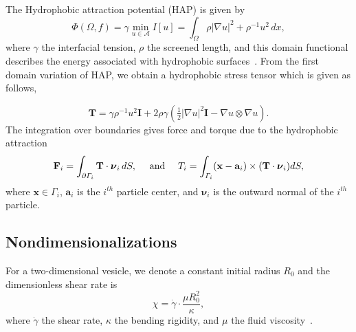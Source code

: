 \documentclass[lineno]{jfm}
\renewcommand{\aa}{\mathbf{a}}
\newcommand{\bd}{\partial}
\newcommand{\FF}{\mathbf{F}}
\newcommand{\nnu}{\boldsymbol{\nu}}
\newcommand{\xx}{\mathbf{x}}
\begin{document}
The Hydrophobic attraction potential (HAP) is given by
\begin{equation}
\label{eq:main}
\Phi(\Omega,f) = \gamma  \min_{u \in \mathcal{A}}
 I[u]  = \int_{\Omega} \rho |\nabla u|^2 + \rho^{-1} u^2 \,dx,
\end{equation}
%
where $\gamma$ the interfacial tension, $\rho$ the screened length, and this domain functional describes the energy associated with hydrophobic surfaces~\cite{Fu20}. From the first domain variation of HAP, we obtain a hydrophobic stress tensor which is given as follows, 

\begin{equation}
\label{eq:stress}
\mathbf{T}
= \gamma\rho^{-1}u^2 \mathbf{I} + 2\rho\gamma \left(\tfrac{1}{2}|\nabla
  u|^2 \mathbf{I} - \nabla u\otimes \nabla u\right).
\end{equation}
%
The integration over boundaries gives force and torque due to the
hydrophobic attraction 
\begin{align}
  \label{eqn:hydrophobicAttraction}
  \FF_i = \int_{\bd \Gamma_i} {\bf T}\cdot \nnu_i \, dS, 
    \quad  \text{ and } \quad
  T_i = \int_{\Gamma_i} (\xx - \aa_i) \times ({\bf T} \cdot \nnu_i) dS,
\end{align}
%
where $\xx \in \Gamma_i$, $\aa_i$ is the $i^{th}$ particle center, and
$\nnu_i$ is the outward normal of the $i^{th}$ particle.



\subsection{Nondimensionalizations}



For a two-dimensional vesicle, we denote a constant initial radius $R_0$ and 
the dimensionless shear rate is
\begin{equation}
\chi = \dot\gamma \cdot\frac{\mu R_0^2}{\kappa},
\end{equation}
%
where $\dot\gamma$ the shear rate, $\kappa$ the bending rigidity, and $\mu$ the fluid viscosity~\cite{Finken08}.
\end{document}
